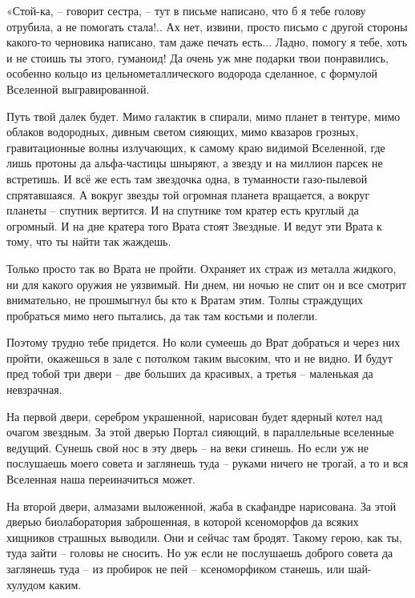 \documentclass[ebook,oneside,final,openright]{memoir}
\begin{document}
\par
«Стой-ка, – говорит сестра, – тут в письме написано, что б я тебе голову отрубила, а не помогать стала!.. Ах нет, извини, просто письмо с другой стороны какого-то черновика написано, там даже печать есть... Ладно, помогу я тебе, хоть и не стоишь ты этого, гуманоид! Да очень уж мне подарки твои понравились, особенно кольцо из цельнометаллического водорода сделанное, с формулой Вселенной выгравированной.\par
\par
Путь твой далек будет. Мимо галактик в спирали, мимо планет в тентуре, мимо облаков водородных, дивным светом сияющих, мимо квазаров грозных, гравитационные волны излучающих, к самому краю видимой Вселенной, где лишь протоны да альфа-частицы шныряют, а звезду и на миллион парсек не встретишь. И всё же есть там звездочка одна, в туманности газо-пылевой спрятавшаяся. А вокруг звезды той огромная планета вращается, а вокруг планеты – спутник вертится. И на спутнике том кратер есть круглый да огромный. И на дне кратера того Врата стоят Звездные. И ведут эти Врата к тому, что ты найти так жаждешь.\par
\par
Только просто так во Врата не пройти. Охраняет их страж из металла жидкого, ни для какого оружия не уязвимый. Ни днем, ни ночью не спит он и все смотрит внимательно, не прошмыгнул бы кто к Вратам этим. Толпы страждущих пробраться мимо него пытались, да так там костьми и полегли.\par
\par
Поэтому трудно тебе придется. Но коли сумеешь до Врат добраться и через них пройти, окажешься в зале с потолком таким высоким, что и не видно. И будут пред тобой три двери – две больших да красивых, а третья – маленькая да невзрачная.\par
\par
На первой двери, серебром украшенной, нарисован будет ядерный котел над очагом звездным. За этой дверью Портал сияющий, в параллельные вселенные ведущий. Сунешь свой нос в эту дверь – на веки сгинешь. Но если уж не послушаешь моего совета и заглянешь туда – руками ничего не трогай, а то и вся Вселенная наша переиначиться может.\par
\par
На второй двери, алмазами выложенной, жаба в скафандре нарисована. За этой дверью биолаборатория заброшенная, в которой ксеноморфов да всяких хищников страшных выводили. Они и сейчас там бродят. Такому герою, как ты, туда зайти – головы не сносить. Но уж если не послушаешь доброго совета да заглянешь туда – из пробирок не пей – ксеноморфиком станешь, или шай-хулудом каким.\par
\end{document}
